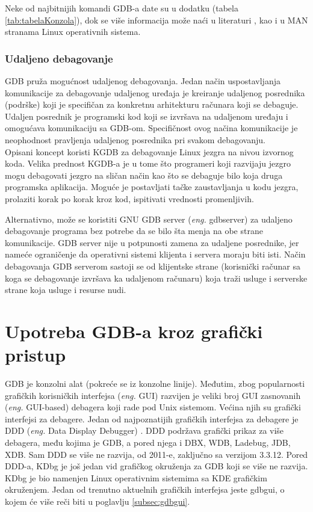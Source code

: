 \documentclass[a4paper]{article}
\begin{document}
Neke od najbitnijih komandi GDB-a date su u dodatku (tabela \ref{tab:tabelaKonzola}), dok se više informacija
može naći u literaturi \cite{commands},
kao i u MAN stranama Linux operativnih sistema. 


\subsubsection{Udaljeno debagovanje}
\label{subsec:gdb_udaljeno}

GDB pruža mogućnost udaljenog debagovanja. 
Jedan način uspostavljanja komunikacije za debagovanje udaljenog uređaja je kreiranje udaljenog posrednika (podrške) koji je specifičan za konkretnu arhitekturu računara koji se debaguje. Udaljen posrednik je programski kod koji se izvršava na udaljenom uređaju i 
omogućava komunikaciju sa GDB-om. Specifičnost ovog načina komunikacije je neophodnost pravljenja udaljenog posrednika pri svakom debagovanju\cite{gdb}. \\
Opisani koncept koristi KGDB za debagovanje Linux jezgra na nivou izvornog koda. Velika prednost KGDB-a 
je u tome što programeri koji razvijaju jezgro mogu debagovati jezgro na sličan način kao što se 
debaguje bilo koja druga programska aplikacija. Moguće je postavljati tačke zaustavljanja u kodu jezgra, prolaziti korak po korak kroz kod, ispitivati vrednosti promenljivih\cite{kgd}.

Alternativno, može se koristiti GNU GDB server (\textit{eng.} gdbserver) za udaljeno debagovanje 
programa bez potrebe da se bilo šta menja na obe strane komunikacije. GDB server nije u potpunosti 
zamena za udaljene posrednike, jer nameće ograničenje da operativni sistemi klijenta i servera 
moraju biti isti. 
Način debagovanja GDB serverom sastoji se od klijentske strane (korisnički računar sa koga se 
debagovanje izvršava ka udaljenom računaru) koja traži usluge i serverske strane 
koja usluge i resurse nudi\cite{master_rad}. 

\section{Upotreba GDB-a kroz grafički pristup}
\label{subsec:gui}

GDB je konzolni alat (pokreće se iz konzolne linije). Međutim, zbog popularnosti grafičkih korisničkih interfejsa
(\textit{eng.} GUI) razvijen je veliki broj GUI zasnovanih (\textit{eng.} GUI-based) debagera koji rade pod Unix sistemom. Većina njih su grafički interfejsi za debagere. Jedan od najpoznatijih grafičkih interfejsa za debagere je DDD (\textit{eng.} Data Display Debugger) \cite{art_debugging}. DDD podržava grafički prikaz za više debagera, među kojima je
GDB, a pored njega i DBX, WDB, Ladebug, JDB, XDB. Sam DDD se više ne razvija, od 2011-e, zaključno sa verzijom 3.3.12. \cite{GNUOrg}
Pored DDD-a, KDbg je još jedan vid grafičkog okruženja za GDB koji se više ne razvija. KDbg je bio namenjen
Linux operativnim sistemima sa KDE grafičkim okruženjem. Jedan od trenutno aktuelnih grafičkih interfejsa jeste
gdbgui, o kojem će više reči biti u poglavlju \ref{subsec:gdbgui}.
\end{document}
